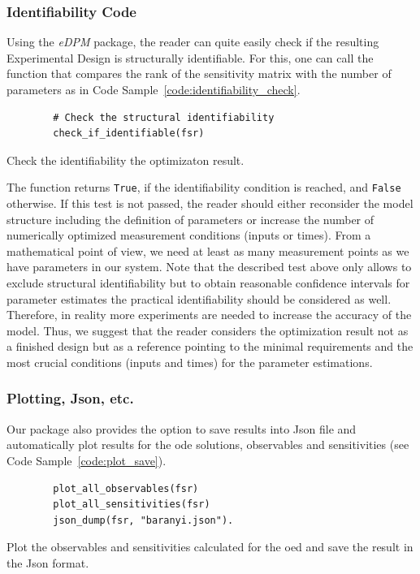 \documentclass[graybox]{svmult}
\begin{document}
\subsubsection*{Identifiability Code}
Using the {\it eDPM} package, the reader can quite easily check if the resulting Experimental Design is structurally identifiable.
For this, one can call the function that compares the rank of the sensitivity matrix with the number of parameters as in Code Sample~\ref{code:identifiability_check}.
\begin{code}[h]
    \begin{verbatim}
        # Check the structural identifiability
        check_if_identifiable(fsr)
    \end{verbatim}
\caption{Check the identifiability the optimizaton result.}
\label{code:identifiability_check}
\end{code}
The function returns \texttt{True}, if the identifiability condition is reached, and \texttt{False} otherwise.
If this test is not passed, the reader should either reconsider the model structure including the definition of parameters or increase the number of numerically optimized measurement conditions (inputs or times).
From a mathematical point of view, we need at least as many measurement points as we have parameters in our system.
Note that the described test above only allows to exclude structural identifiability but to obtain reasonable confidence intervals for parameter estimates the practical identifiability should be considered as well.
Therefore, in reality more experiments are needed to increase the accuracy of the model.
Thus, we suggest that the reader considers the optimization result not as a finished design but as a reference pointing to the minimal requirements and the most crucial conditions (inputs and times) for the parameter estimations.
%
\subsubsection*{Plotting, Json, etc.}
Our package also provides the option to save results into Json file and automatically plot results for the ode solutions, observables and sensitivities (see Code Sample~\ref{code:plot_save}).
\begin{code}[h]
    \begin{verbatim}
        plot_all_observables(fsr)
        plot_all_sensitivities(fsr)
        json_dump(fsr, "baranyi.json").
    \end{verbatim}
\caption{Plot the observables and sensitivities calculated for the \ac{oed} and save the result in the Json format.}
\label{code:plot_save}
\end{code}
%
%
%
\end{document}
